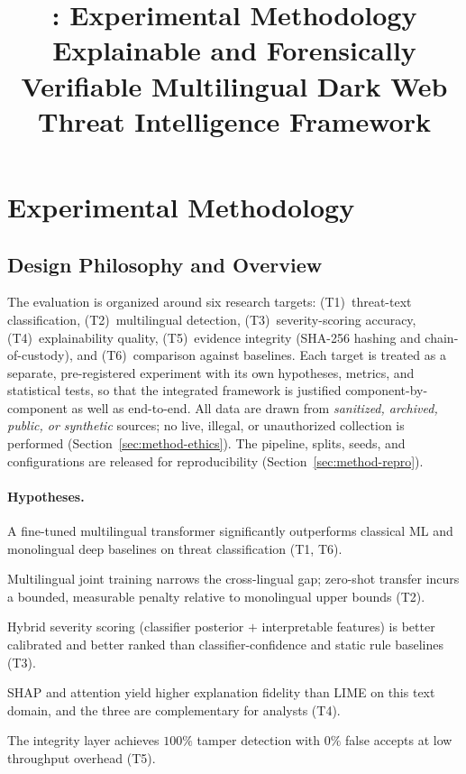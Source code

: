 \documentclass[11pt,a4paper]{article}
\title{\framework{}: Experimental Methodology\\
\large Explainable and Forensically Verifiable Multilingual Dark Web\\
Threat Intelligence Framework}
\author{}
\date{}
\begin{document}
\maketitle

\section{Experimental Methodology}\label{sec:method}

\subsection{Design Philosophy and Overview}
The evaluation is organized around six research targets: (T1)~threat-text
classification, (T2)~multilingual detection, (T3)~severity-scoring accuracy,
(T4)~explainability quality, (T5)~evidence integrity (SHA-256 hashing and
chain-of-custody), and (T6)~comparison against baselines. Each target is treated as a
separate, pre-registered experiment with its own hypotheses, metrics, and statistical
tests, so that the integrated framework is justified component-by-component as well as
end-to-end. All data are drawn from \emph{sanitized, archived, public, or synthetic}
sources; no live, illegal, or unauthorized collection is performed
(Section~\ref{sec:method-ethics}). The pipeline, splits, seeds, and configurations are
released for reproducibility (Section~\ref{sec:method-repro}).

\paragraph{Hypotheses.}
\begin{description}[leftmargin=2.6em,style=nextline,itemsep=1pt]
  \item[H1] A fine-tuned multilingual transformer significantly outperforms classical
  ML and monolingual deep baselines on threat classification (T1, T6).
  \item[H2] Multilingual joint training narrows the cross-lingual gap; zero-shot
  transfer incurs a bounded, measurable penalty relative to monolingual upper bounds
  (T2).
  \item[H3] Hybrid severity scoring (classifier posterior $+$ interpretable features) is
  better calibrated and better ranked than classifier-confidence and static
  rule baselines (T3).
  \item[H4] SHAP and attention yield higher explanation fidelity than LIME on this text
  domain, and the three are complementary for analysts (T4).
  \item[H5] The integrity layer achieves $100\%$ tamper detection with $0\%$ false
  accepts at low throughput overhead (T5).
\end{description}
\end{document}
